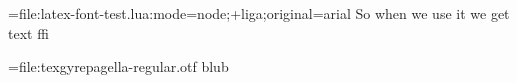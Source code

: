 \documentclass{article}
\begin{document}

\font\testluafont=file:latex-font-test.lua:mode=node;+liga;original=arial
{\testluafont So when we use it we get text ffi}



\font\test={file:texgyrepagella-regular.otf} \test blub
\end{document}
